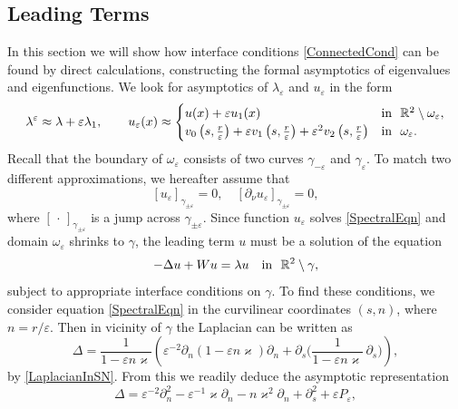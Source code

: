 \documentclass[reqno]{amsart}
\theoremstyle{plain}
\numberwithin{equation}{section}
\renewcommand{\kappa}{\varkappa}
\newcommand{\Real}{\mathbb R}
\newcommand{\eps}{\varepsilon}
\newcommand\nep{\textstyle\frac r\eps}
\begin{document}
\subsection{Leading Terms}
\label{Sec:LimitOperator}

In this section we will show how interface conditions \eqref{ConnectedCond} can be found by direct calculations, constructing the formal asymptotics of  eigenvalues and eigenfunctions.
We  look for asymptotics of $\lambda_\eps$ and $u_\eps$ in the form
\begin{equation}\label{AsymptoticsUe}
\lambda^\eps\approx \lambda+\eps \lambda_1, \qquad u_\eps(x)\approx
\begin{cases}
  u(x)+\eps u_1(x)& \hbox{in \ }\Real^2\setminus \omega_\eps, \\
    v_0\left(s,\nep\right)+\eps v_1\left(s,\nep\right)+\eps^2 v_2\left(s,\nep\right)
&\hbox{in \ } \omega_\eps.
\end{cases}
\end{equation}
Recall that the boundary of $\omega_\eps$ consists of  two curves
$\gamma_{-\eps}$ and $\gamma_{\eps}$.
To match two different approximations, we hereafter assume that
\begin{equation}\label{MatchingCnds}
  [u_\eps]_{\gamma_{\pm\eps}}=0, \quad [\partial_\nu u_\eps]_{\gamma_{\pm\eps}}=0,
\end{equation}
where $[\,\cdot\,]_{\gamma_{\pm\eps}}$ is a jump  across $\gamma_{\pm\eps}$.
Since function $u_\eps$ solves \eqref{SpectralEqn} and domain $\omega_\eps$ shrinks to $\gamma$, the leading term $u$ must be a solution of the equation
\begin{equation*}
-\Delta u+Wu= \lambda u \quad \hbox{in \ } \Real^2\setminus \gamma,
\end{equation*}
subject to appropriate interface conditions on $\gamma$.
To find these conditions, we consider equation \eqref{SpectralEqn} in the curvilinear coordinates $(s,n)$, where $n=r/\eps$. Then in vicinity of $\gamma$ the Laplacian can be written as
\begin{equation}
  \Delta =\frac1{1-\eps n\kappa}\left( \eps^{-2}\partial_n
  (1-\eps n\kappa)\partial_n +\partial_s
  \Big(\frac1{1-\eps n\kappa}\,\partial_s\Big)\right),
\end{equation}
by \eqref{LaplacianInSN}.
From this we readily deduce the asymptotic representation
\begin{equation*}
\Delta= \eps^{-2}\partial^2_n-\eps^{-1}\kappa\partial_n
-n\kappa^2\partial_n+\partial^2_s+\eps P_\eps,
\end{equation*}
\end{document}
